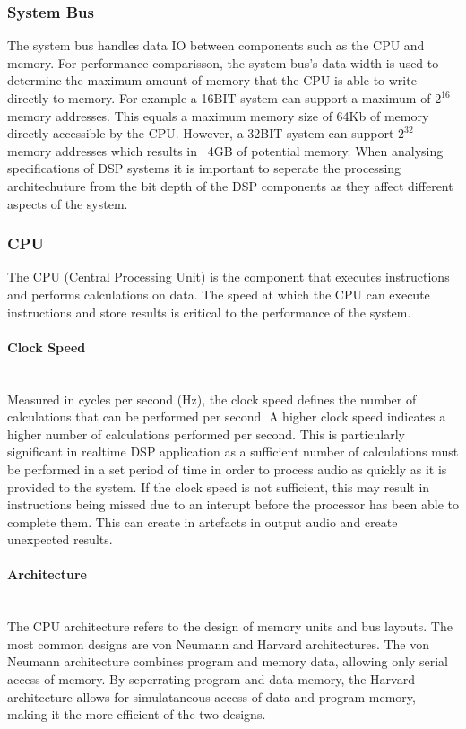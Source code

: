 \documentclass{scrartcl}
\begin{document}
    \subsubsection{System Bus}
    The system bus handles data IO between components such as the CPU
    and memory. For performance comparisson, the system bus's data width is
    used to determine the maximum amount of memory that the CPU is able to
    write directly to memory. 
    For example a 16BIT system can support a maximum of $2^{16}$ memory
    addresses. This equals a maximum memory size of 64Kb of memory directly
    accessible by the CPU. However, a 32BIT system can support $2^{32}$ memory
    addresses which results in ~4GB of potential memory.
    When analysing specifications of DSP systems it is important to seperate
    the processing architechuture from the bit depth of the DSP components as
    they affect different aspects of the system.

    \subsubsection{CPU}\label{CPU}
    The CPU (Central Processing Unit) is the component that executes
    instructions and performs calculations on data. The speed at which the CPU
    can execute instructions and store results is critical to the performance
    of the system.

    \paragraph{Clock Speed}~\\
    Measured in cycles per second (Hz), the clock speed defines the number of
    calculations that can be performed per second. A higher clock speed
    indicates a higher number of calculations performed per second. This is
    particularly significant in realtime DSP application as a sufficient number
    of calculations must be performed in a set period of time in order to
    process audio as quickly as it is provided to the system.  If the clock
    speed is not sufficient, this may result in instructions being missed due
    to an interupt before the processor has been able to complete them. This
    can create in artefacts in output audio and create unexpected results.

    \paragraph{Architecture}~\\
    The CPU architecture refers to the design of memory units and bus layouts.
    The most common designs are von Neumann and Harvard architectures. The von
    Neumann architecture combines program and memory data, allowing only serial
    access of memory. By seperrating program and data memory, the Harvard
    architecture allows for simulataneous access of data and program memory,
    making it the more efficient of the two designs.
    
\end{document}
